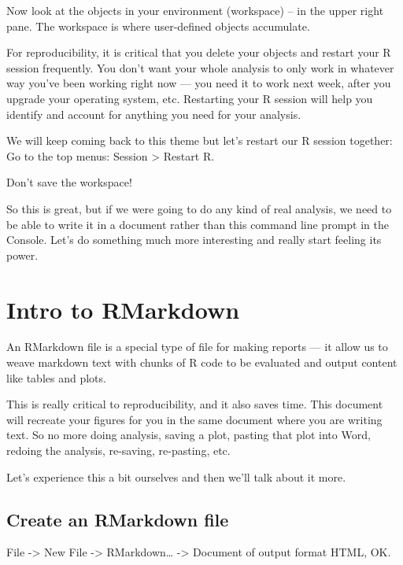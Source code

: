 \documentclass[]{book}
\begin{document}
Now look at the objects in your environment (workspace) -- in the upper right pane. The workspace is where user-defined objects accumulate.

For reproducibility, it is critical that you delete your objects and restart your R session frequently. You don't want your whole analysis to only work in whatever way you've been working right now --- you need it to work next week, after you upgrade your operating system, etc. Restarting your R session will help you identify and account for anything you need for your analysis.

We will keep coming back to this theme but let's restart our R session together: Go to the top menus: Session \textgreater{} Restart R.

Don't save the workspace!

So this is great, but if we were going to do any kind of real analysis, we need to be able to write it in a document rather than this command line prompt in the Console. Let's do something much more interesting and really start feeling its power.

\hypertarget{intro-to-rmarkdown}{%
\section{Intro to RMarkdown}\label{intro-to-rmarkdown}}

An RMarkdown file is a special type of file for making reports --- it allow us to weave markdown text with chunks of R code to be evaluated and output content like tables and plots.

This is really critical to reproducibility, and it also saves time. This document will recreate your figures for you in the same document where you are writing text. So no more doing analysis, saving a plot, pasting that plot into Word, redoing the analysis, re-saving, re-pasting, etc.

Let's experience this a bit ourselves and then we'll talk about it more.

\hypertarget{create-an-rmarkdown-file}{%
\subsection{Create an RMarkdown file}\label{create-an-rmarkdown-file}}

File -\textgreater{} New File -\textgreater{} RMarkdown\ldots{} -\textgreater{} Document of output format HTML, OK.
\end{document}
